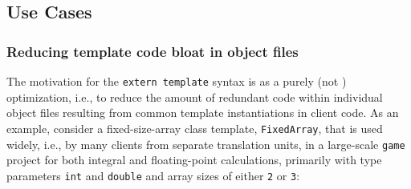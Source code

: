 \subsection[Use Cases]{Use Cases}\label{use-cases}

\subsubsection[Reducing template code bloat in object files]{Reducing template code bloat in object files}\label{reducing-template-code-bloat-in-object-files}

The motivation for the \lstinline!extern!~\lstinline!template! syntax is as a
purely  (not ) optimization, i.e., to
reduce the amount of redundant code within individual object files
resulting from common template instantiations in client code. As an
example, consider a fixed-size-array class template,
\lstinline!FixedArray!, that is used widely, i.e., by many clients from
separate translation units, in a large-scale \lstinline!game! project for
both integral and floating-point calculations, primarily with type
parameters \lstinline!int! and \lstinline!double! and array sizes of either
\lstinline!2! or \lstinline!3!:


